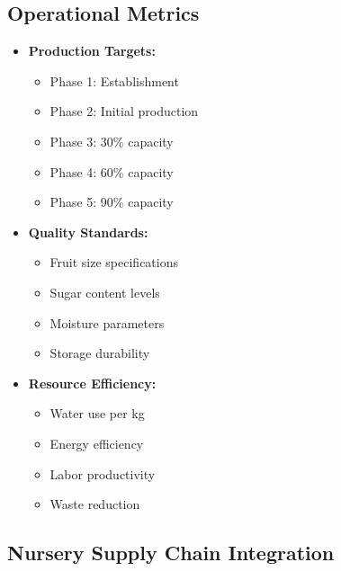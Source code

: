 \subsection{Operational Metrics}
\begin{itemize}
    \item \textbf{Production Targets:}
    \begin{itemize}
        \item Phase 1: Establishment
        \item Phase 2: Initial production
        \item Phase 3: 30\% capacity
        \item Phase 4: 60\% capacity
        \item Phase 5: 90\% capacity
    \end{itemize}
    \item \textbf{Quality Standards:}
    \begin{itemize}
        \item Fruit size specifications
        \item Sugar content levels
        \item Moisture parameters
        \item Storage durability
    \end{itemize}
    \item \textbf{Resource Efficiency:}
    \begin{itemize}
        \item Water use per kg
        \item Energy efficiency
        \item Labor productivity
        \item Waste reduction
    \end{itemize}
\end{itemize}

\subsection{Nursery Supply Chain Integration}

